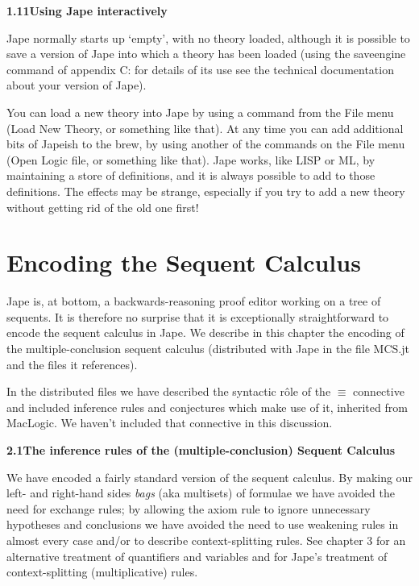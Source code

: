 \documentclass[11pt]{book}
\newcommand{\tab}{\hspace{5mm}}
\begin{document}
\textbf{{\large 1.11\tab Using Jape interactively}}


Jape normally starts up `empty', with no theory loaded, although it is possible to save a version of Jape into which a theory has been loaded (using the saveengine command of appendix C: for details of its use see the technical documentation about your version of Jape).


You can load a new theory into Jape by using a command from the File menu (Load New Theory, or something like that). At any time you can add additional bits of Japeish to the brew, by using another of the commands on the File menu (Open Logic file, or something like that). Jape works, like LISP or ML, by maintaining a store of definitions, and it is always possible to add to those definitions. The effects may be strange, especially if you try to add a new theory without getting rid of the old one first!



\chapter{Encoding the Sequent Calculus}


Jape is, at bottom, a backwards-reasoning proof editor working on a tree of sequents. It is therefore no surprise that it is exceptionally straightforward to encode the sequent calculus in Jape. We describe in this chapter the encoding of the multiple-conclusion sequent calculus (distributed with Jape in the file MCS.jt and the files it references).


In the distributed files we have described the syntactic r\^{o}le of the \ensuremath{\equiv} connective and included inference rules and conjectures which make use of it, inherited from MacLogic. We haven't included that connective in this discussion.


\textbf{{\large 2.1\tab The inference rules of the (multiple-conclusion) Sequent Calculus}}


We have encoded a fairly standard version of the sequent calculus.
By making our left- and right-hand sides \textit{bags} (aka multisets) of formulae we have avoided the need for exchange rules; by allowing the axiom rule to ignore unnecessary hypotheses and conclusions we have avoided the need to use weakening rules in almost every case and/or to describe context-splitting rules. See chapter 3 for an alternative treatment of quantifiers and variables and for Jape's treatment of context-splitting (multiplicative) rules.
\end{document}
